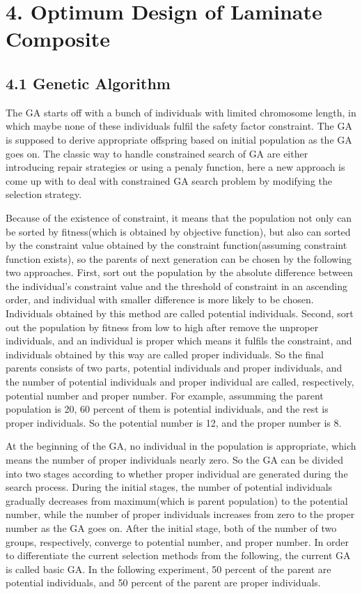 \documentclass[Afour,sagev,times]{sagej}
\begin{document}
\section {4. Optimum Design of Laminate Composite}
\subsection{4.1  Genetic Algorithm}
The GA starts off with a bunch of individuals with limited chromosome length, in which maybe none
of these individuals fulfil the safety factor constraint. The GA is supposed to derive appropriate
offspring based on initial population as the GA goes on. The classic way to handle constrained
search of GA are either introducing repair strategies or using a penaly function, here a new
approach is come up with to deal with constrained GA search problem by modifying the selection
strategy. 

Because of the existence of constraint, it means that the population not only can be sorted by
fitness(which is obtained by objective function), but also can sorted by the constraint value obtained by the constraint function(assuming
constraint function exists), so the
parents of next generation can be chosen by the following two approaches. First, sort out the population by
the absolute difference between the individual's constraint value and the threshold of constraint in an
ascending order, and individual with smaller difference is more likely to be chosen. Individuals
obtained by this method are called potential individuals. Second, sort out the population by
fitness from low to high after remove the unproper individuals, and an individual is proper which
means it fulfils the constraint, and individuals obtained by this way are called proper individuals.
So the final parents consists of two parts, potential individuals and proper individuals, and the
number of potential individuals and proper individual are called, respectively, potential number and
proper number. For example, assumming the parent population is 20, 60 percent of them is
potential individuals, and the rest is proper individuals. So the potential number is 12, and the
proper number is 8.

At the beginning of the GA, no individual in the population is appropriate, which means the
number of proper individuals nearly zero.  So the GA can be divided into two stages according to
whether proper individual are generated during the search process. During the initial stages, the
number of potential individuals gradually decreases from maximum(which is parent population) to the potential
number, while the number of proper individuals increases from zero to the proper number as the GA
goes on. After the initial stage, both of the number of two groups, respectively, converge to
potential number, and proper number.
In order to differentiate the current selection methods from the following, the current GA is called
basic GA. In the following experiment, 50 percent of the parent are potential individuals, and 50
percent of the parent are proper individuals.
\end{document}
